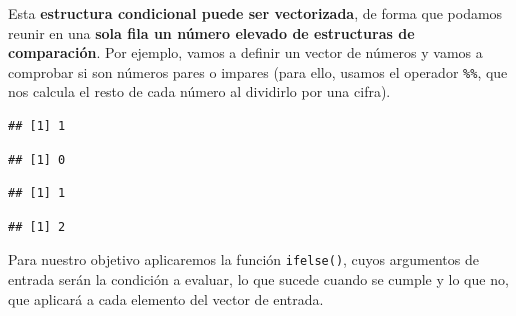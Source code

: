 \documentclass[11pt,]{book}
\newenvironment{Shaded}{\begin{snugshade}}{\end{snugshade}}
\newcommand{\DecValTok}[1]{\textcolor[rgb]{0.06,0.06,0.06}{#1}}
\newcommand{\OperatorTok}[1]{\textcolor[rgb]{0.43,0.43,0.43}{\textbf{#1}}}
\newcommand{\StringTok}[1]{\textcolor[rgb]{0.5,0.5,0.5}{#1}}
\begin{document}
Esta \textbf{estructura condicional puede ser vectorizada}, de forma que podamos reunir en una \textbf{sola fila un número elevado de estructuras de comparación}. Por ejemplo, vamos a definir un vector de números y vamos a comprobar si son números pares o impares (para ello, usamos el operador \texttt{\%\%}, que nos calcula el resto de cada número al dividirlo por una cifra).

\begin{Shaded}
\end{Shaded}

\begin{verbatim}
## [1] 1
\end{verbatim}

\begin{Shaded}
\end{Shaded}

\begin{verbatim}
## [1] 0
\end{verbatim}

\begin{Shaded}
\end{Shaded}

\begin{verbatim}
## [1] 1
\end{verbatim}

\begin{Shaded}
\end{Shaded}

\begin{verbatim}
## [1] 2
\end{verbatim}

Para nuestro objetivo aplicaremos la función \texttt{ifelse()}, cuyos argumentos de entrada serán la condición a evaluar, lo que sucede cuando se cumple y lo que no, que aplicará a cada elemento del vector de entrada.
\end{document}
